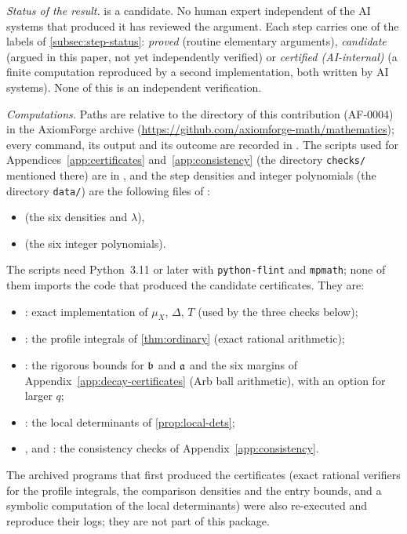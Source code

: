 \sloppy

\emph{Status of the result.}  is a candidate. No human expert independent of the
AI systems that produced it has reviewed the argument. Each step carries one of the labels of
\cref{subsec:step-status}: \emph{proved} (routine elementary arguments), \emph{candidate}
(argued in this paper, not yet independently verified) or \emph{certified (AI-internal)} (a finite
computation reproduced by a second implementation, both written by AI systems). None of this is
an independent verification.

\emph{Computations.} Paths are relative to the directory of this contribution (AF-0004) in
the AxiomForge archive (\url{https://github.com/axiomforge-math/mathematics}); every command, its
output and its outcome are recorded in . The scripts used for
Appendices~\ref{app:certificates} and~\ref{app:consistency} (the directory \texttt{checks/}
mentioned there) are in , and the step densities and integer
polynomials (the directory \texttt{data/}) are the following files of
:
\begin{itemize}
\item {} (the six densities and $\lambda$),
\item {} (the six integer polynomials).
\end{itemize}
The scripts need Python~3.11 or later with \texttt{python-flint} and \texttt{mpmath}; none of them
imports the code that produced the candidate certificates. They are:
\begin{itemize}
\item {}: exact implementation of $\mu_X$, $\Delta$, $T$ (used by the three checks
below);
\item {}: the profile integrals of \cref{thm:ordinary} (exact rational arithmetic);
\item {}: the rigorous bounds for $\mathfrak{b}$ and $\mathfrak{a}$ and the six margins of
Appendix~\ref{app:decay-certificates} (Arb ball arithmetic), with an option for larger $q$;
\item {}: the local determinants of \cref{prop:local-dets};
\item {},  and : the
consistency checks of Appendix~\ref{app:consistency}.
\end{itemize}
The archived programs that first produced the certificates (exact rational verifiers for the
profile integrals, the comparison densities and the entry bounds, and a symbolic computation of
the local determinants) were also re-executed and reproduce their logs; they are not part of this
package.

